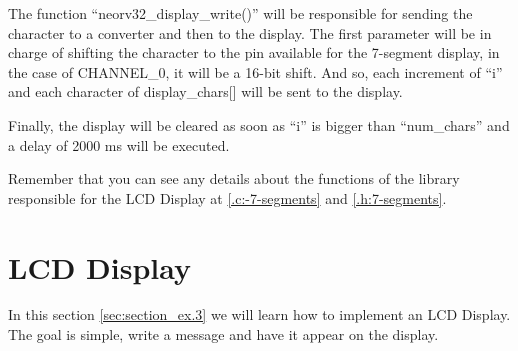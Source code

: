         The function ``neorv32\_display\_write()'' will be responsible for sending the character to a converter and then to the display. The first parameter will be in charge of shifting the character to the pin available for the 7-segment display, in the case of CHANNEL\_0, it will be a 16-bit shift. And so, each increment of ``i'' and each character of display\_chars[] will be sent to the display.
        
        Finally, the display will be cleared as soon as ``i'' is bigger than ``num\_chars'' and a delay of 2000 ms will be executed.
        
        Remember that you can see any details about the functions of the library responsible for the LCD Display at \autoref{.c:-7-segments} and \autoref{.h:7-segments}.

            
    \section{LCD Display} \label{sec:section_ex.3}

        In this section \autoref{sec:section_ex.3} we will learn how to implement an LCD Display. The goal is simple, write a message and have it appear on the display.

